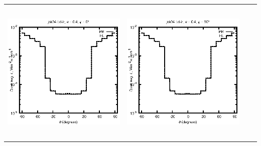 \begin{tabular}{c c c c}
\includegraphics[height=7cm]{../eps/jok04_Ld_ir_fwd.eps} &
\includegraphics[height=7cm]{../eps/jok04_Ld_ir_cross.eps} \\
\end{tabular}

\pagebreak

